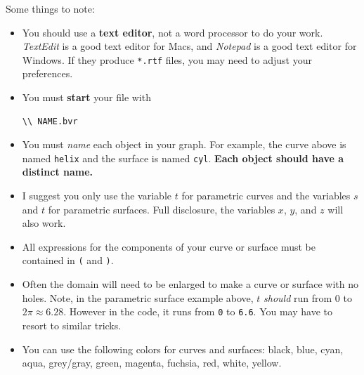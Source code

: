 \documentclass{ximera}
\begin{document}
Some things to note: 
\begin{itemize}
\item You should use a \textbf{text editor}, not a word processor to
  do your work. \textit{TextEdit} is a good text editor for Macs, and
  \textit{Notepad} is a good text editor for Windows. If they produce
  \texttt{*.rtf} files, you may need to adjust your preferences.
\item You must \textbf{start} your file with
\begin{verbatim}
\\ NAME.bvr
\end{verbatim}
  \item You must \textit{name} each object in your graph. For example,
    the curve above is named \verb|helix| and the surface is named
    \verb|cyl|. \textbf{Each object should have a distinct name.}
  \item I suggest you only use the variable $t$ for parametric curves
    and the variables $s$ and $t$ for parametric surfaces. Full
    disclosure, the variables $x$, $y$, and $z$ will also work.
  \item All expressions for the components of your curve or surface
    must be contained in \verb|(| and \verb|)|.
  \item Often the domain will need to be enlarged to make a curve or
    surface with no holes. Note, in the parametric surface example
    above, $t$ \textit{should} run from $0$ to $2\pi\approx
    6.28$. However in the code, it runs from \verb|0| to
    \verb|6.6|. You may have to resort to similar tricks.
  \item You can use the following colors for curves and surfaces: black, blue,
    cyan, aqua, grey/gray, green, magenta, fuchsia, red, white,
    yellow. 
\end{itemize}
\end{document}
